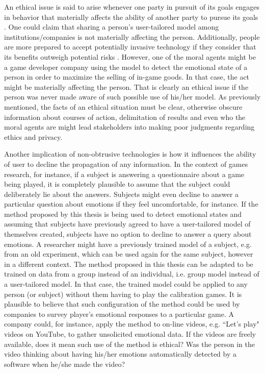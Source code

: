 An ethical issue is said to arise whenever one party in pursuit of its goals engages in behavior that materially affects the ability of another party to pursue its goals \parencite{mason1995applying}. One could claim that sharing a person's user-tailored model among institutions/companies is not materially affecting the person. Additionally, people are more prepared to accept potentially invasive technology if they consider that its benefits outweigh potential risks \parencite{ladd1991computers}. However, one of the moral agents might be a game developer company using the model to detect the emotional state of a person in order to maximize the selling of in-game goods. In that case, the act might be materially affecting the person. That is clearly an ethical issue if the person was never made aware of such possible use of his/her model. As previously mentioned, the facts of an ethical situation must be clear, otherwise obscure information about courses of action, delimitation of results and even who the moral agents are might lead stakeholders into making poor judgments regarding ethics and privacy.

Another implication of non-obtrusive technologies is how it influences the ability of user to decline the propagation of any information. In the context of games research, for instance, if a subject is answering a questionnaire about a game being played, it is completely plausible to assume that the subject could deliberately lie about the answers. Subjects might even decline to answer a particular question about emotions if they feel uncomfortable, for instance. If the method proposed by this thesis is being used to detect emotional states and assuming that subjects have previously agreed to have a user-tailored model of themselves created, subjects have no option to decline to answer a query about emotions. A researcher might have a previously trained model of a subject, e.g. from an old experiment, which can be used again for the same subject, however in a different context. The method proposed in this thesis can be adapted to be trained on data from a group instead of an individual, i.e. group model instead of a user-tailored model. In that case, the trained model could be applied to any person (or subject) without them having to play the calibration games. It is plausible to believe that such configuration of the method could be used by companies to survey player's emotional responses to a particular game. A company could, for instance, apply the method to on-line videos, e.g. ``Let's play" videos on YouTube, to gather unsolicited emotional data. If the videos are freely available, does it mean such use of the method is ethical? Was the person in the video thinking about having his/her emotions automatically detected by a software when he/she made the video?

